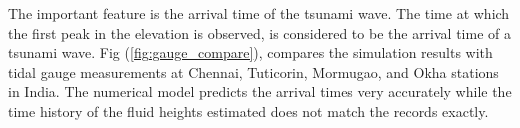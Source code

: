 The important feature is the arrival time of the tsunami wave. The time at which the first peak in the elevation is observed, is considered to be the arrival time of a tsunami wave. Fig (\ref{fig:gauge_compare}), compares the simulation results with tidal gauge measurements at Chennai, Tuticorin, Mormugao, and Okha stations in India. The numerical model predicts the arrival times very accurately while the time history of the fluid heights estimated does not match the records exactly. 
\begin{figure}%
\begin{center}
   \hspace{0.5cm}
\end{center}
\end{figure}
